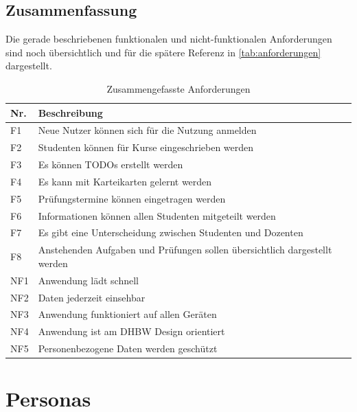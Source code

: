 \subsection{Zusammenfassung}
Die gerade beschriebenen funktionalen und nicht-funktionalen Anforderungen sind noch übersichtlich und für die spätere Referenz in \autoref{tab:anforderungen} dargestellt.


\begin{table}[h]
    \centering
    \begin{tabularx}{.8\textwidth}{l|X}
        Nr.     & Beschreibung                              \\\hline
        F1      & Neue Nutzer können sich für die Nutzung anmelden                    \\
        F2      & Studenten können für Kurse eingeschrieben werden  \\
        F3      & Es können TODOs erstellt werden   \\
        F4      & Es kann mit Karteikarten gelernt werden  \\
        F5      & Prüfungstermine können eingetragen werden  \\
        F6      & Informationen können allen Studenten mitgeteilt werden  \\
        F7      & Es gibt eine Unterscheidung zwischen Studenten und Dozenten  \\
        F8      & Anstehenden Aufgaben und Prüfungen sollen übersichtlich dargestellt werden  \\
        NF1     & Anwendung lädt schnell                    \\
        NF2     & Daten jederzeit einsehbar                 \\
        NF3     & Anwendung funktioniert auf allen Geräten  \\
        NF4     & Anwendung ist am DHBW Design orientiert   \\
        NF5     & Personenbezogene Daten werden geschützt  \\
    \end{tabularx}
    \caption{Zusammengefasste Anforderungen}
    \label{tab:anforderungen}
\end{table}
\section{Personas}


